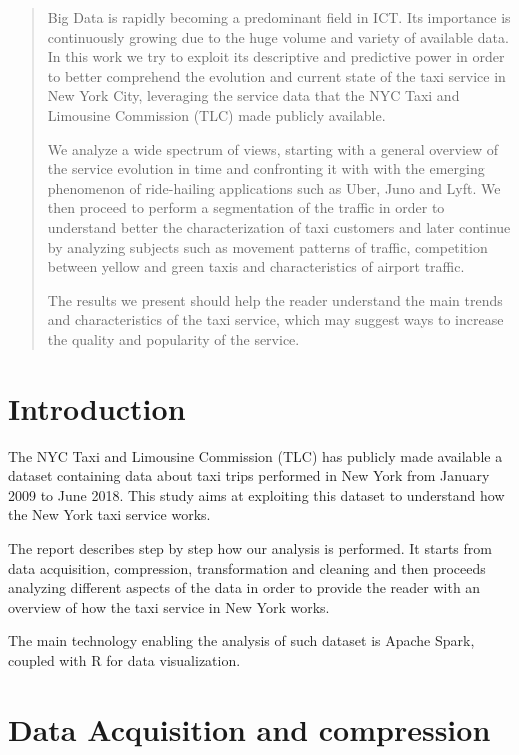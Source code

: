 \documentclass{acm_proc_article-sp-sigmod09}
\begin{document}
\maketitle
\begin{abstract}
	
Big Data is rapidly becoming a predominant field in ICT. Its importance is continuously growing due to the huge volume and variety of available data. In this work we try to exploit its descriptive and predictive power in order to better comprehend the evolution and current state of the taxi service in New York City, leveraging the service data that the NYC Taxi and Limousine Commission (TLC) made publicly available.

We analyze a wide spectrum of views, starting with a general overview of the service evolution in time and confronting it with with the emerging phenomenon of ride-hailing applications such as Uber, Juno and Lyft. We then proceed to perform a segmentation of the traffic in order to understand better the characterization of taxi customers and later continue by analyzing subjects such as movement patterns of traffic, competition between yellow and green taxis and characteristics of airport traffic.

The results we present should help the reader understand the main trends and characteristics of the taxi service, which may suggest ways to increase the quality and popularity of the service.

\end{abstract}

\section{Introduction}
The NYC Taxi and Limousine Commission (TLC) has publicly made available a dataset containing data about taxi trips performed in New York from January 2009 to June 2018. This study aims at exploiting this dataset to understand how the New York taxi service works.

The report describes step by step how our analysis is performed. It starts from data acquisition, compression, transformation and cleaning and then proceeds analyzing different aspects of the data in order to provide the reader with an overview of how the taxi service in New York works.

The main technology enabling the analysis of such dataset is Apache Spark, coupled with R for data visualization.

\section{Data Acquisition and compression}
\end{document}
